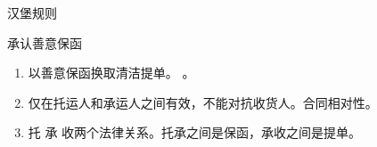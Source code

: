 \begin{enumerate}
\begin{enumerate}
\begin{kk}{汉堡规则}
                  \begin{kk}{承认善意保函}
                    \begin{enumerate}
                      \item 以善意保函换取清洁提单。
                            。
                      \item 仅在托运人和承运人之间有效，不能对抗收货人。合同相对性。
                      \item 托 \zyjt 承 \zyjt 收两个法律关系。托承之间是保函，承收之间是提单。
                    \end{enumerate}
                  \end{kk}
                \end{kk}

        \end{enumerate}
\end{enumerate}
